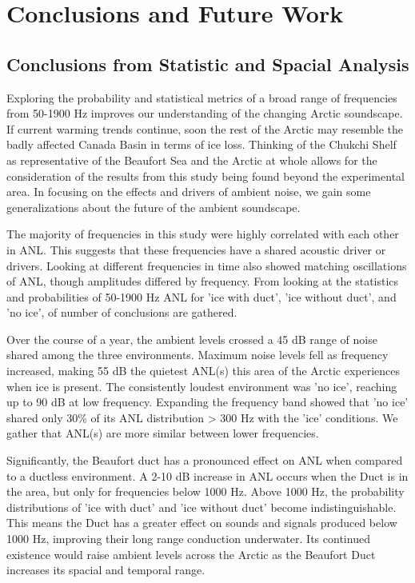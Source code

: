 
\chapter{Conclusions and Future Work}

\section{Conclusions from Statistic and Spacial Analysis}

Exploring the probability and statistical metrics of a broad range of frequencies from 50-1900 Hz improves our understanding of the changing Arctic soundscape. If current warming trends continue, soon the rest of the Arctic may resemble the badly affected Canada Basin in terms of ice loss. Thinking of the Chukchi Shelf as representative of the Beaufort Sea and the Arctic at whole allows for the consideration of the results from this study being found beyond the experimental area.  In focusing on the effects and drivers of ambient noise, we gain some generalizations about the future of the ambient soundscape.

The majority of frequencies in this study were highly correlated with each other in ANL. This suggests that these frequencies have a shared acoustic driver or drivers. Looking at different frequencies in time also showed matching oscillations of ANL, though amplitudes differed by frequency. From looking at the statistics and probabilities of 50-1900 Hz ANL for 'ice with duct', 'ice without duct', and 'no ice', of number of conclusions are gathered. 

Over the course of a year, the ambient levels crossed a 45 dB range of noise shared among the three environments. Maximum noise levels fell as frequency increased, making 55 dB the quietest ANL(s) this area of the Arctic experiences when ice is present. The consistently loudest environment was 'no ice', reaching up to 90 dB at low frequency. Expanding the frequency band showed that 'no ice' shared only 30\% of its  ANL distribution > 300 Hz with the 'ice' conditions. We gather that ANL(s) are more similar between lower frequencies.

Significantly, the Beaufort duct has a pronounced effect on ANL when compared to a ductless environment. A 2-10 dB increase in ANL occurs when the Duct is in the area, but only for frequencies below 1000 Hz. Above 1000 Hz, the probability distributions of 'ice with duct' and 'ice without duct' become indistinguishable. This means the Duct has a greater effect on sounds and signals produced below 1000 Hz, improving their long range conduction underwater. Its continued existence would raise ambient levels across the Arctic as the Beaufort Duct increases its spacial and temporal range.

